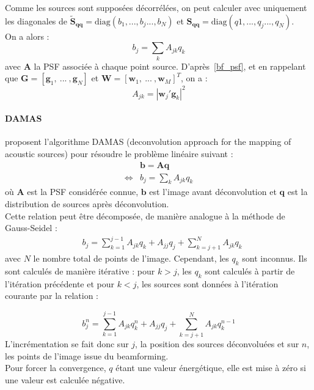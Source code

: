Comme les sources sont supposées décorrélées, on peut calculer avec uniquement les diagonales de  $\bm{\tilde{S}_{qq}}=\text{diag}(b_1, ... , b_j...,b_N)$ et $\bm{S_{qq}}=\text{diag}(q1, ... , q_j...,q_N)$.\\

On a alors : 
\begin{equation}
	b_j = \sum_k A_{jk}q_k
\end{equation}
avec  $\bm{A}$ la PSF associée à chaque point source. D'après~\ref{bf_psf}, et en rappelant que $\bm{G}=[\bm{g}_1,~...~,\bm{g}_N]$ et $\bm{W}=[\bm{w}_1,~...~,\bm{w}_M]^T$, on a : 
\begin{equation}
	A_{jk}=|\bm{w}_j'\bm{g}_k|^2
\end{equation}



\paragraph{DAMAS}

 \cite{Brooks2006} proposent l'algorithme DAMAS (deconvolution approach for the mapping of acoustic sources) pour résoudre le problème linéaire suivant : 
\begin{align}
	&\bm{b}=\bm{Aq}\\
	\Leftrightarrow & b_j=\sum_k A_{jk}q_k
\end{align}
où $\bm{A}$ est la PSF considérée connue, $\bm{b}$ est l'image avant déconvolution et $\bm{q}$ est la distribution de sources après déconvolution.\\
Cette relation peut être décomposée, de manière analogue à la méthode de Gauss-Seidel : 
\begin{align}
	&b_j= \sum_{k=1}^{j-1}A_{jk}q_k + A_{jj}q_j + \sum_{k=j+1}^{N}A_{jk}q_k
\end{align}
avec $N$ le nombre total de points de l'image.
Cependant, les $q_k$ sont inconnus. Ils sont calculés de manière itérative : pour $k>j$, les $q_k$ sont calculés à partir de l'itération précédente et pour $k<j$, les sources sont données à l'itération courante par la relation : 

\begin{equation}
	b_j^n= \sum_{k=1}^{j-1}A_{jk}q_k^{n} + A_{jj}q_j + \sum_{k=j+1}^{N}A_{jk}q_k^{n-1}
\end{equation}
L'incrémentation se fait donc sur $j$, la position des sources déconvoluées et sur $n$, les points de l'image issue du beamforming.\\
Pour forcer la convergence, $q$ étant une valeur énergétique, elle est mise à zéro si une valeur est calculée négative.
 
